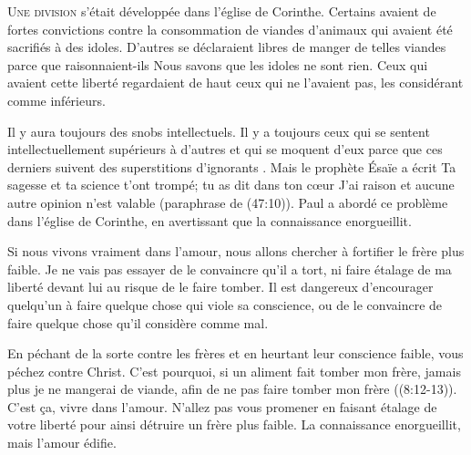 \dvrule







\lettrine{U}{ne division} s'était développée dans l'église de Corinthe.
 Certains avaient de fortes convictions
 contre la consommation de viandes d'animaux
 qui avaient été sacrifiés à des idoles.
 D'autres se déclaraient libres de manger
 de telles viandes parce que \ocadr raisonnaient-ils \fcadr{}
 \Og Nous savons que les idoles ne sont rien. \Fg{}
 Ceux qui avaient cette liberté regardaient de haut
 ceux qui ne l'avaient pas, les considérant comme inférieurs.

Il y aura toujours des snobs intellectuels.
 Il y a toujours ceux qui se sentent intellectuellement
 supérieurs à d'autres et qui se moquent d'eux
 parce que ces derniers suivent \Og des superstitions d'ignorants \Fg{}.
 Mais le prophète Ésaïe a écrit\frcolon{} 
 \Og Ta sagesse et ta science t'ont trompé;
 tu as dit dans ton c\oe{}ur\frcolon{} 
 \Og J'ai raison et aucune autre opinion n'est valable \Fg{}
 (paraphrase de (47:10)).
 Paul a abordé ce problème dans l'église de Corinthe,
 en avertissant que \Og la connaissance enorgueillit. \Fg{}


Si nous vivons vraiment dans l'amour,
 nous allons chercher à fortifier le frère plus faible.
 Je ne vais pas essayer de le convaincre qu'il a tort,
 ni faire étalage de ma liberté devant lui
 au risque de le faire tomber.
 Il est dangereux d'encourager quelqu'un
 à faire quelque chose qui viole sa conscience,
 ou de le convaincre de faire quelque chose
 qu'il considère comme mal.

\Og En péchant de la sorte contre les frères
 et en heurtant leur conscience faible,
 vous péchez contre Christ.
 C'est pourquoi, si un aliment fait tomber mon frère,
 jamais plus je ne mangerai de viande,
 afin de ne pas faire tomber mon frère \Fg{}
 ((8:12-13)).
 C'est \c{c}a, vivre dans l'amour.
 N'allez pas vous promener en faisant étalage
 de votre liberté pour ainsi détruire un frère plus faible.
 La connaissance enorgueillit, mais l'amour édifie.

